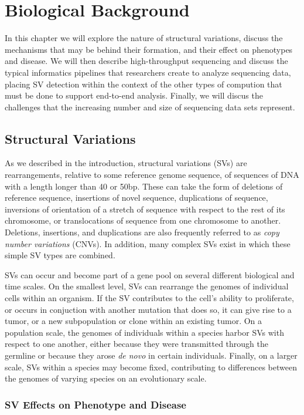 \chapter{Biological Background}\label{chap_background}

In this chapter we will explore the nature of structural variations, discuss the mechanisms that may be behind their formation, and their effect on phenotypes and disease. We will then describe high-throughput sequencing and discuss the typical informatics pipelines that researchers create to analyze sequencing data, placing SV detection within the context of the other types of compution that must be done to support end-to-end analysis. Finally, we will discus the challenges that the increasing number and size of sequencing data sets represent.

\section{Structural Variations}

As we described in the introduction, structural variations (SVs) are rearrangements, relative to some reference genome sequence, of sequences of DNA with a length longer than 40 or 50bp. These can take the form of deletions of reference sequence, insertions of novel sequence, duplications of sequence, inversions of orientation of a stretch of sequence with respect to the rest of its chromosome, or translocations of sequence from one chromosome to another. Deletions, insertions, and duplications are also frequently referred to as \emph{copy number variations} (CNVs). In addition, many complex SVs exist in which these simple SV types are combined.

SVs can occur and become part of a gene pool on several different biological and time scales. On the smallest level, SVs can rearrange the genomes of individual cells within an organism. If the SV contributes to the cell's ability to proliferate, or occurs in conjuction with another mutation that does so, it can give rise to a tumor, or a new subpopulation or clone within an existing tumor. On a population scale, the genomes of individuals within a species harbor SVs with respect to one another, either because they were transmitted through the germline or because they arose \emph{de novo} in certain individuals. Finally, on a larger scale, SVs within a species may become fixed, contributing to differences between the genomes of varying species on an evolutionary scale.

\subsection{SV Effects on Phenotype and Disease}

